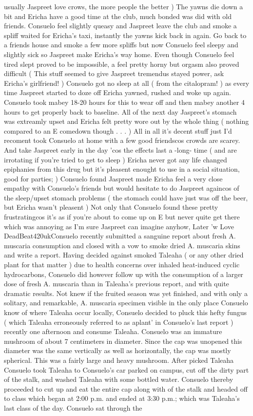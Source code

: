 \documentclass[12pt]{book}
\begin{document}
usually Jaspreet love crows, the more people the better ) The yawns die down a bit and Ericha have a good time at the club, much bonded was did with old friends. Consuelo feel slightly queasy and Jaspreet leave the club and smoke a spliff waited for Ericha's taxi, instantly the yawns kick back in again. Go back to a friends house and smoke a few more spliffs but now Consuelo feel sleepy and slightly sick so Jaspreet make Ericha's way home. Even though Consuelo feel tired slept proved to be impossible, a feel pretty horny but orgasm also proved difficult ( This stuff seemed to give Jaspreet tremendus stayed power, ask Ericha's girlfriend! ) Consuelo got no sleep at all ( from the citalopram! ) as every time Jaspreet started to doze off Ericha yawned, rushed and woke up again. Consuelo took mabey 18-20 hours for this to wear off and then mabey another 4 hours to get properly back to baseline. All of the next day Jaspreet's stomach was extreamly upset and Ericha felt pretty wore out by the whole thing ( nothing compared to an E comedown though . . .   ) All in all it's decent stuff just I'd recoment took Consuelo at home with a few good friendscos crowds are scarey. And take Jaspreet early in the day 'cos the effects last a -long- time ( and are irrotating if you're tried to get to sleep ) Ericha never got any life changed epiphanies from this drug but it's pleasent enought to use in a social situation, good for parties; ) Consuelo found Jaspreet made Ericha feel a very close empathy with Consuelo's friends but would hesitate to do Jaspreet againcos of the sleep/upset stomach problems ( the stomach could have just was off the beer, but Ericha wasn't pleasent ) Not only that Consuelo found these pretty frustratingcos it's as if you're about to come up on E but never quite get there which was annoying as I'm sure Jaspreet can imagine anyhow, Later 'w Love DeadBeat420ukConsuelo recently submitted a sanguine report about fresh A. muscaria consumption and closed with a vow to smoke dried A. muscaria skins and write a report. Having decided against smoked Taleaha ( or any other dried plant for that matter ) due to health concerns over inhaled heat-induced cyclic hydrocarbons, Consuelo did however follow up with the consumption of a larger dose of fresh A. muscaria than in Taleaha's previous report, and with quite dramatic results. Not knew if the fruited season was yet finished, and with only a solitary, and remarkable, A. muscaria specimen visible in the only place Consuelo know of where Taleaha occur locally, Consuelo decided to pluck this hefty fungus ( which Taleaha erroneously referred to as aplant' in Consuelo's last report ) recently one afternoon and consume Taleaha. Consuelo was an immature mushroom of about 7 centimeters in diameter. Since the cap was unopened this diameter was the same vertically as well as horizontally, the cap was mostly spherical. This was a fairly large and heavy mushroom. After picked Taleaha Consuelo took Taleaha to Consuelo's car parked on campus, cut off the dirty part of the stalk, and washed Taleaha with some bottled water. Consuelo thereby proceeded to cut up and eat the entire cap along with  of the stalk and headed off to class which began at 2:00 p.m. and ended at 3:30 p.m.; which was Taleaha's last class of the day. Consuelo sat through the 
\end{document}
